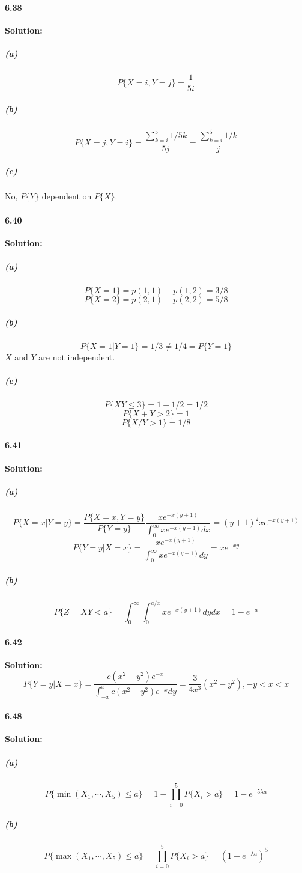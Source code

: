 \documentclass[11pt]{article}
\begin{document}
	\paragraph{6.38}\textbf{Solution:}
		\subparagraph{(a)}
		\[P\{X = i, Y = j\} = \frac{1}{5i}\]
		\subparagraph{(b)}
		\[P\{X = j, Y = i\} = \frac{\sum_{k = i}^5 1 / 5k}{5j} = \frac{\sum_{k = i}^5 1 / k}{j}\]
		\subparagraph{(c)}
		No, $P\{Y\}$ dependent on $P\{X\}$.
	\paragraph{6.40}\textbf{Solution:}
		\subparagraph{(a)}
			\[P\{X = 1\} = p(1, 1) + p(1, 2) = 3/8\]
			\[P\{X = 2\} = p(2, 1) + p(2, 2) = 5/8\]
		\subparagraph{(b)}
			\[P\{X = 1 | Y = 1\} = 1/3 \neq 1/4 = P\{Y = 1\}\]
			$X$ and $Y$ are not independent.
		\subparagraph{(c)}
			\[P\{XY \leq 3\} = 1 - 1/2 = 1/2\]
			\[P\{X + Y > 2\} = 1\]
			\[P\{X / Y > 1\} = 1 / 8\]
	\paragraph{6.41}\textbf{Solution:}
		\subparagraph{(a)}
			\[P\{X = x | Y = y\} = \frac{P\{X = x, Y = y\}}{P\{Y = y\}} \frac{xe^{-x(y+1)}}{\int_0^\infty xe^{-x(y + 1)}dx} = (y + 1)^2 xe^{-x(y + 1)}\]
			\[P\{Y = y | X = x\} = \frac{xe^{-x(y + 1)}}{\int_0^\infty xe^{-x(y + 1)}dy} = xe^{-xy}\]
		\subparagraph{(b)}
			\[P\{Z = XY < a\} = \int_0^\infty \int_0^{a/x}xe^{-x(y + 1)}dydx = 1 - e^{-a}\]
	\paragraph{6.42}\textbf{Solution:}
		\[P\{Y = y | X = x\} = \frac{c(x^2 - y^2)e^{-x}}{\int_{-x}^{x} c(x^2 - y^2)e^{-x}dy} = \frac{3}{4x^3}(x^2 - y^2), -y < x < x\]
	\paragraph{6.48}\textbf{Solution:}
		\subparagraph{(a)}
		\[P\{\min(X_1, \cdots, X_5) \leq a\} = 1 - \prod_{i = 0}^5 P\{X_i > a\} = 1 - e^{-5\lambda a}\]
		\subparagraph{(b)}
		\[P\{\max(X_1, \cdots, X_5) \leq a\} = \prod_{i = 0}^5 P\{X_i > a\} = (1 - e^{-\lambda a})^5\]
\end{document}
